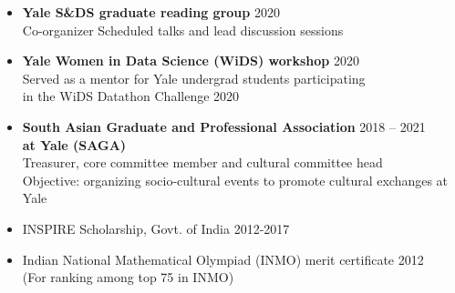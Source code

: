 \documentclass[letterpaper,12pt,oneside]{article}
\theoremstyle{definition}
\begin{document}
\begin{itemize}
				\item[] {\bf Yale S\&DS graduate reading group} \hfill 2020\\
				Co-organizer
				Scheduled talks and lead discussion sessions
				
				\item[] {\bf Yale Women in Data Science (WiDS) workshop} \hfill 2020\\
				Served as a mentor for Yale undergrad students participating \\
				in the
				{WiDS Datathon Challenge 2020}
				
				\item[] {\bf South Asian Graduate and Professional Association} \hfill 2018 -- 2021\\
				{\bf at Yale (SAGA)}\\
				Treasurer, core committee member and cultural committee head\\
				Objective: organizing socio-cultural events to promote cultural exchanges at Yale
				
				
			\end{itemize}
			
			\begin{itemize}
				\item [] INSPIRE Scholarship, Govt. of India \hfill 2012-2017
				\item [] Indian National Mathematical Olympiad (INMO) merit certificate \hfill 2012\\
				(For ranking among top 75 in INMO)
			\end{itemize}
			
			\vfill
			
\end{document}
